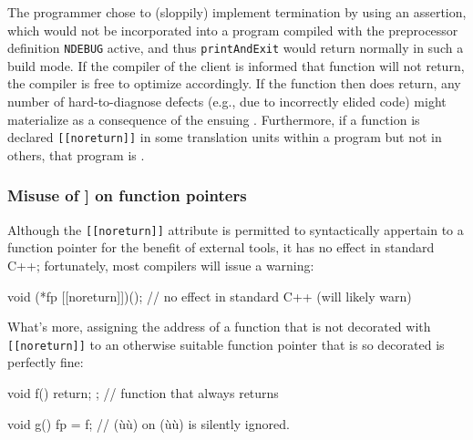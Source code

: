 \noindent The programmer chose to (sloppily) implement termination by using an
assertion, which would not be incorporated into a program compiled with
the preprocessor definition \lstinline!NDEBUG! active, and thus
\lstinline!printAndExit! would return normally in such a build mode. If the
compiler of the client is informed that function will not return, the compiler is
free to optimize accordingly. If the function then does return, any
number of hard-to-diagnose defects (e.g., due to incorrectly elided
code) might materialize as a consequence of the ensuing
. Furthermore, if a function is declared \lstinline![[noreturn]]! in some
translation units within a program but not in others, that program is
.

\subsubsection[Misuse of {\tt[[noreturn]]} on function pointers]{Misuse of {\SubsubsecCode [[noreturn]]} on function pointers}\label{misuse-of-[[noreturn]]-on-function-pointers}

Although the \lstinline![[noreturn]]! attribute is permitted to syntactically appertain
to a function pointer for the benefit of external tools,
it has no effect in standard C++; fortunately, most compilers will issue a warning:

\begin{emcppslisting}[emcppsbatch=e6,emcppsignore={Only works on gcc -fpermissive}]
void (*fp [[noreturn]])();  // no effect in standard C++ (will likely warn)
\end{emcppslisting}

\noindent What's more, assigning the address of a function
that is not decorated with \lstinline![[noreturn]]! to an otherwise
suitable function pointer that is so decorated is perfectly fine:

\begin{emcppslisting}[emcppsbatch=e6,emcppsignore={Only works on gcc -fpermissive}]
void f() { return; };  // function that always returns

void g()
{
    fp = f;  // (ù{\codeincomments{[[noreturn]]}}ù) on (ù{}ù) is silently ignored.
}
\end{emcppslisting}

